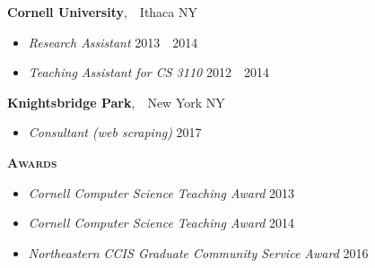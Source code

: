 \documentclass{article}
\newcommand{\mysection}[1]{\vspace{0.5cm} \noindent\textsc{\textbf{#1}}~\hrulefill}
\newcommand{\mysubsection}[1]{\noindent\textbf{#1}}
\newcommand{\datespan}[2]{#1~\textendash{}~#2}
\begin{document}
\mysubsection{Cornell University},~~Ithaca NY
\begin{itemize}
  \item \emph{Research Assistant} \hfill \datespan{2013}{2014}
  \item \emph{Teaching Assistant for CS 3110} \hfill \datespan{2012}{2014}
\end{itemize}

\mysubsection{Knightsbridge Park},~~New York NY
\begin{itemize}
  \item \emph{Consultant (web scraping)} \hfill 2017
\end{itemize}


\newpage
\mysection{Awards} %
\begin{itemize}
  \item \emph{Cornell Computer Science Teaching Award} \hfill 2013
  \item \emph{Cornell Computer Science Teaching Award} \hfill 2014
  \item \emph{Northeastern CCIS Graduate Community Service Award} \hfill 2016
\end{itemize}

\end{document}
